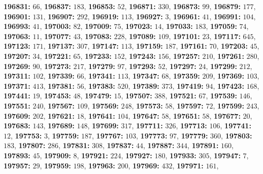 \textsf{\bfseries 196831:} $66$, \textsf{\bfseries 196837:} $183$, \textsf{\bfseries 196853:} $52$, \textsf{\bfseries 196871:} $330$, \textsf{\bfseries 196873:} $99$, \textsf{\bfseries 196879:} $177$, \textsf{\bfseries 196901:} $131$, \textsf{\bfseries 196907:} $292$, \textsf{\bfseries 196919:} $113$, \textsf{\bfseries 196927:} $3$, \textsf{\bfseries 196961:} $41$, \textsf{\bfseries 196991:} $104$, \textsf{\bfseries 196993:} $41$, \textsf{\bfseries 197003:} $82$, \textsf{\bfseries 197009:} $75$, \textsf{\bfseries 197023:} $14$, \textsf{\bfseries 197033:} $183$, \textsf{\bfseries 197059:} $74$, \textsf{\bfseries 197063:} $11$, \textsf{\bfseries 197077:} $43$, \textsf{\bfseries 197083:} $228$, \textsf{\bfseries 197089:} $109$, \textsf{\bfseries 197101:} $23$, \textsf{\bfseries 197117:} $645$, \textsf{\bfseries 197123:} $171$, \textsf{\bfseries 197137:} $307$, \textsf{\bfseries 197147:} $113$, \textsf{\bfseries 197159:} $187$, \textsf{\bfseries 197161:} $70$, \textsf{\bfseries 197203:} $45$, \textsf{\bfseries 197207:} $34$, \textsf{\bfseries 197221:} $65$, \textsf{\bfseries 197233:} $152$, \textsf{\bfseries 197243:} $156$, \textsf{\bfseries 197257:} $210$, \textsf{\bfseries 197261:} $280$, \textsf{\bfseries 197269:} $90$, \textsf{\bfseries 197273:} $217$, \textsf{\bfseries 197279:} $97$, \textsf{\bfseries 197293:} $52$, \textsf{\bfseries 197297:} $24$, \textsf{\bfseries 197299:} $212$, \textsf{\bfseries 197311:} $102$, \textsf{\bfseries 197339:} $66$, \textsf{\bfseries 197341:} $113$, \textsf{\bfseries 197347:} $68$, \textsf{\bfseries 197359:} $209$, \textsf{\bfseries 197369:} $103$, \textsf{\bfseries 197371:} $413$, \textsf{\bfseries 197381:} $56$, \textsf{\bfseries 197383:} $520$, \textsf{\bfseries 197389:} $373$, \textsf{\bfseries 197419:} $94$, \textsf{\bfseries 197423:} $168$, \textsf{\bfseries 197441:} $19$, \textsf{\bfseries 197453:} $48$, \textsf{\bfseries 197479:} $15$, \textsf{\bfseries 197507:} $388$, \textsf{\bfseries 197521:} $67$, \textsf{\bfseries 197539:} $146$, \textsf{\bfseries 197551:} $240$, \textsf{\bfseries 197567:} $109$, \textsf{\bfseries 197569:} $248$, \textsf{\bfseries 197573:} $58$, \textsf{\bfseries 197597:} $72$, \textsf{\bfseries 197599:} $243$, \textsf{\bfseries 197609:} $202$, \textsf{\bfseries 197621:} $18$, \textsf{\bfseries 197641:} $104$, \textsf{\bfseries 197647:} $58$, \textsf{\bfseries 197651:} $58$, \textsf{\bfseries 197677:} $20$, \textsf{\bfseries 197683:} $143$, \textsf{\bfseries 197689:} $148$, \textsf{\bfseries 197699:} $317$, \textsf{\bfseries 197711:} $326$, \textsf{\bfseries 197713:} $106$, \textsf{\bfseries 197741:} $12$, \textsf{\bfseries 197753:} $3$, \textsf{\bfseries 197759:} $187$, \textsf{\bfseries 197767:} $103$, \textsf{\bfseries 197773:} $97$, \textsf{\bfseries 197779:} $360$, \textsf{\bfseries 197803:} $183$, \textsf{\bfseries 197807:} $286$, \textsf{\bfseries 197831:} $308$, \textsf{\bfseries 197837:} $44$, \textsf{\bfseries 197887:} $344$, \textsf{\bfseries 197891:} $160$, \textsf{\bfseries 197893:} $45$, \textsf{\bfseries 197909:} $8$, \textsf{\bfseries 197921:} $224$, \textsf{\bfseries 197927:} $180$, \textsf{\bfseries 197933:} $305$, \textsf{\bfseries 197947:} $7$, \textsf{\bfseries 197957:} $29$, \textsf{\bfseries 197959:} $198$, \textsf{\bfseries 197963:} $200$, \textsf{\bfseries 197969:} $432$, \textsf{\bfseries 197971:} $161$, 
